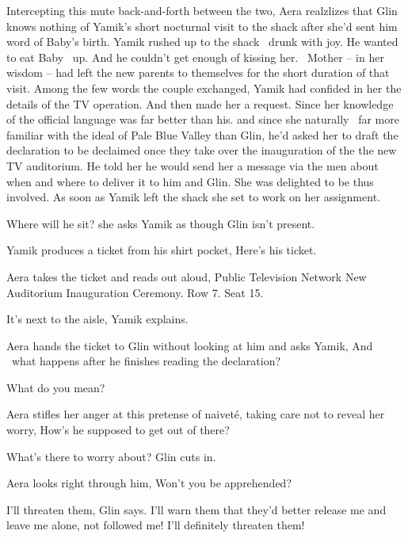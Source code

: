 \documentclass[letterpaper]{article}
\begin{document}
Intercepting this mute back-and-forth between the two, Aera realzlizes that Glin knows nothing of Yamik's short
nocturnal visit to the shack after she'd sent him word of Baby's birth. Yamik rushed up to the shack \ drunk with joy.
He wanted to eat Baby \ up. And he{ }couldn't get enough of kissing her. ~Mother -- in her wisdom -- had
left the new parents to themselves for the short duration of that visit. Among the few words the couple exchanged,
Yamik had confided in her the details of the TV operation. And then made her a request. Since her knowledge of the
official language was far better than his. and since she naturally \ far more familiar with the ideal of Pale Blue
Valley than Glin, he'd asked her to draft the declaration to be declaimed once they take over the inauguration of the
the new TV auditorium. He told her he would send her a message via the men about when and where to deliver it to him
and Glin. She was delighted to be thus involved. As soon as Yamik left the shack she set to work on her
assignment{. }

{\textquotedbl}Where will he sit?{\textquotedbl} she asks Yamik as though Glin isn't present. 

Yamik produces a ticket from his shirt pocket, {\textquotedbl}Here's his ticket.{\textquotedbl} 

Aera takes the ticket and reads out aloud, {\textquotedbl}Public Television Network New Auditorium Inauguration
Ceremony. Row 7. Seat 15.{\textquotedbl} 

{\textquotedbl}It's next to the aisle,{\textquotedbl} Yamik explains. 

Aera hands the ticket to Glin without looking at him and asks Yamik, {\textquotedbl}And \ what happens after he finishes
reading the declaration?{\textquotedbl} 

{\textquotedbl}What do you mean?{\textquotedbl} 

Aera stifles her anger at this pretense of naivet\'e, taking care not to reveal her worry, {\textquotedbl}How's he
supposed to get out of there?{\textquotedbl} 

{\textquotedbl}What's there to worry about?{\textquotedbl} Glin cuts in{.}

Aera looks right through him, {\textquotedbl}Won't you be apprehended?{\textquotedbl} 

{\textquotedbl}I'll threaten them,{\textquotedbl} Glin says. {\textquotedbl}I'll warn them that they'd better release me
and leave me alone, not followed me! I'll definitely threaten them!{\textquotedbl}
\end{document}
